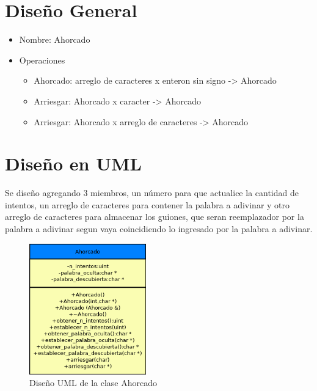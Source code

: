 \documentclass[a4paper,12pt]{article}
\begin{document}
\marginsize{2cm}{2cm}{2cm}{2cm}
\renewcommand\contentsname{Indice}
\renewcommand{\footrulewidth}{0.4pt}
\renewcommand{\headrulewidth}{0.4pt}

\pagestyle{empty}

\newpage

\setcounter{page}{1}
\section{Diseño General}
\begin{itemize}
	\item Nombre: Ahorcado
	\item Operaciones
	\begin {itemize}
		\item Ahorcado: arreglo de caracteres x enteron sin signo -> Ahorcado
		\item Arriesgar: Ahorcado x caracter -> Ahorcado
		\item Arriesgar: Ahorcado x arreglo de caracteres -> Ahorcado
	\end{itemize}
\end{itemize}
\section{Diseño en UML}
Se diseño agregando 3 miembros, un número para que actualice la cantidad de intentos, un arreglo de caracteres para contener la palabra a adivinar y otro arreglo de caracteres para almacenar los guiones, que seran reemplazador por la palabra a adivinar segun vaya coincidiendo lo ingresado por la palabra a adivinar.

\begin{figure}[h]
  \centering
    \includegraphics[width=0.45\textwidth]{Ahorcado_UML.png}
  \caption{Diseño UML de la clase Ahorcado}
  \label{fig:disenio}
\end{figure}
\end{document}
